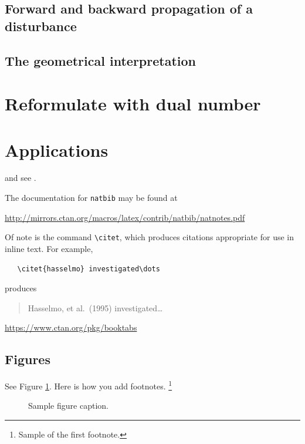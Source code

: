 \documentclass{article}
\begin{document}
\subsection{Forward and backward propagation of a disturbance}

\subsection{The geometrical interpretation}


\section{Reformulate with dual number}


\section{Applications}

\lipsum[8] \cite{kour2014real,kour2014fast} and see \cite{hadash2018estimate}.

The documentation for \verb+natbib+ may be found at
\begin{center}
  \url{http://mirrors.ctan.org/macros/latex/contrib/natbib/natnotes.pdf}
\end{center}
Of note is the command \verb+\citet+, which produces citations
appropriate for use in inline text.  For example,
\begin{verbatim}
   \citet{hasselmo} investigated\dots
\end{verbatim}
produces
\begin{quote}
  Hasselmo, et al.\ (1995) investigated\dots
\end{quote}

\begin{center}
  \url{https://www.ctan.org/pkg/booktabs}
\end{center}


\subsection{Figures}
\lipsum[10] 
See Figure \ref{fig:fig1}. Here is how you add footnotes. \footnote{Sample of the first footnote.}
\lipsum[11] 

\begin{figure}
  \centering
  \fbox{\rule[-.5cm]{4cm}{4cm} \rule[-.5cm]{4cm}{0cm}}
  \caption{Sample figure caption.}
  \label{fig:fig1}
\end{figure}
\end{document}
